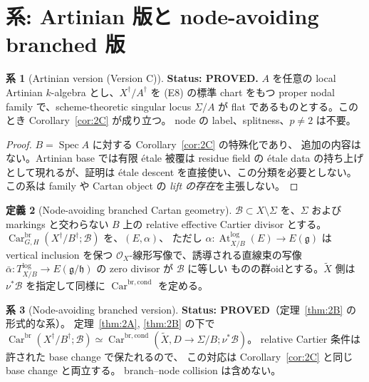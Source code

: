 \documentclass[11pt,a4paper]{article}
\numberwithin{equation}{section}
\theoremstyle{definition}
\newtheorem{definition}{定義}[section]
\newtheorem{corollary}[definition]{系}
\newcommand{\OO}{\mathcal O}
\newcommand{\g}{\mathfrak g}
\newcommand{\h}{\mathfrak h}
\newcommand{\Atlog}{\operatorname{At}^{\log}}
\newcommand{\tX}{\widetilde X}
\newcommand{\Car}{\operatorname{Car}}
\begin{document}
\section{系: Artinian 版と node-avoiding branched 版}\label{sec:art}

\begin{corollary}[Artinian version (Version C)]\label{cor:art}
\textbf{Status: PROVED.}
$A$ を任意の local Artinian $k$-algebra とし、$X^\dagger/A^\dagger$ を
(E8) の標準 chart をもつ proper nodal family で、scheme-theoretic singular locus
$\Sigma/A$ が flat であるものとする。このとき Corollary~\ref{cor:2C} が成り立つ。
node の label、splitness、$p\ne2$ は不要。
\end{corollary}

\begin{proof}
$B=\operatorname{Spec}A$ に対する Corollary~\ref{cor:2C} の特殊化であり、
追加の内容はない。Artinian base では有限 étale 被覆は residue field の étale data
の持ち上げとして現れるが、証明は étale descent を直接使い、この分類を必要としない。
この系は family や Cartan object の \emph{lift の存在}を主張しない。
\end{proof}

\begin{definition}[Node-avoiding branched Cartan geometry]\label{def:branched}
$\mathcal B\subset X\setminus\Sigma$ を、$\Sigma$ および markings と交わらない
$B$ 上の relative effective Cartier divisor とする。
$\Car^{\mathrm{br}}_{G,H}(X^\dagger/B^\dagger;\mathcal B)$ を、$(E,\alpha)$、
ただし $\alpha:\Atlog_{X/B}(E)\to E(\g)$ は vertical inclusion を保つ
$\OO_X$-線形写像で、誘導される直線束の写像
$\bar\alpha:T^{\log}_{X/B}\to E(\g/\h)$ の zero divisor が $\mathcal B$ に等しい
ものの群oidとする。$\tX$ 側は $\nu^*\mathcal B$ を指定して同様に
$\Car^{\mathrm{br,cond}}$ を定める。
\end{definition}

\begin{corollary}[Node-avoiding branched version]\label{cor:branched}
\textbf{Status: PROVED}（定理~\ref{thm:2B} の形式的な系）。
定理~\ref{thm:2A}, \ref{thm:2B} の下で
$\Car^{\mathrm{br}}(X^\dagger/B^\dagger;\mathcal B)\simeq
\Car^{\mathrm{br,cond}}(\tX,D\to\Sigma/B;\nu^*\mathcal B)$。
relative Cartier 条件は許された base change で保たれるので、
この対応は Corollary~\ref{cor:2C} と同じ base change と両立する。
branch--node collision は含めない。
\end{corollary}
\end{document}

